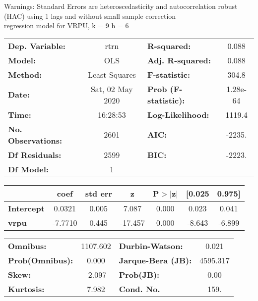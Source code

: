 Warnings: \newline
 [1] Standard Errors are heteroscedasticity and autocorrelation robust (HAC) using 1 lags and without small sample correction\\ 

regression model for VRPU, k = 9 h = 6\begin{center}
\begin{tabular}{lclc}
\toprule
\textbf{Dep. Variable:}    &       rtrn       & \textbf{  R-squared:         } &     0.088   \\
\textbf{Model:}            &       OLS        & \textbf{  Adj. R-squared:    } &     0.088   \\
\textbf{Method:}           &  Least Squares   & \textbf{  F-statistic:       } &     304.8   \\
\textbf{Date:}             & Sat, 02 May 2020 & \textbf{  Prob (F-statistic):} &  1.28e-64   \\
\textbf{Time:}             &     16:28:53     & \textbf{  Log-Likelihood:    } &    1119.4   \\
\textbf{No. Observations:} &        2601      & \textbf{  AIC:               } &    -2235.   \\
\textbf{Df Residuals:}     &        2599      & \textbf{  BIC:               } &    -2223.   \\
\textbf{Df Model:}         &           1      & \textbf{                     } &             \\
\bottomrule
\end{tabular}
\begin{tabular}{lcccccc}
                   & \textbf{coef} & \textbf{std err} & \textbf{z} & \textbf{P$> |$z$|$} & \textbf{[0.025} & \textbf{0.975]}  \\
\midrule
\textbf{Intercept} &       0.0321  &        0.005     &     7.087  &         0.000        &        0.023    &        0.041     \\
\textbf{vrpu}      &      -7.7710  &        0.445     &   -17.457  &         0.000        &       -8.643    &       -6.899     \\
\bottomrule
\end{tabular}
\begin{tabular}{lclc}
\textbf{Omnibus:}       & 1107.602 & \textbf{  Durbin-Watson:     } &    0.021  \\
\textbf{Prob(Omnibus):} &   0.000  & \textbf{  Jarque-Bera (JB):  } & 4595.317  \\
\textbf{Skew:}          &  -2.097  & \textbf{  Prob(JB):          } &     0.00  \\
\textbf{Kurtosis:}      &   7.982  & \textbf{  Cond. No.          } &     159.  \\
\bottomrule
\end{tabular}
\end{center}

